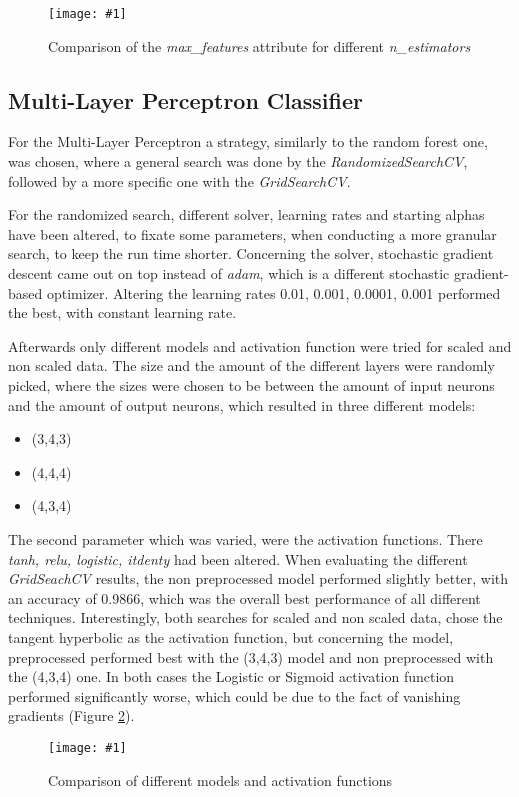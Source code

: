 \documentclass{article}
\newcommand{\size}{0.8\textwidth}
\newcommand{\image}[3]{
\begin{figure}
\begin{center}
\texttt{[image: \#1]}
\caption{#2}
#3
\end{center}
\end{figure}
}
\begin{document}
\image{plots/rf_np_comparision.png}{Comparison of the \textit{max\_features} attribute for different \textit{n\_estimators}}{\label{rf}}

\subsection{Multi-Layer Perceptron Classifier}
For the Multi-Layer Perceptron a strategy, similarly to the random forest one,  was chosen, where a general search was done by the \textit{RandomizedSearchCV}, followed by a more specific one with the \textit{GridSearchCV}.

For the randomized search, different solver, learning rates and starting alphas have been altered, to fixate some parameters, when conducting a more granular search, to keep the run time shorter. Concerning the solver, stochastic gradient descent came out on top instead of \textit{adam}, which is a different stochastic gradient-based optimizer. Altering the learning rates 0.01, 0.001, 0.0001, 0.001 performed the best, with constant learning rate.

Afterwards only different models and activation function were tried for scaled and non scaled data. The size and the amount of the different layers were randomly picked, where the sizes were chosen to be between the amount of input neurons and the amount of output neurons, which resulted in three different models:

\begin{itemize}
\item (3,4,3)
\item (4,4,4)
\item (4,3,4)
\end{itemize}

The second parameter which was varied, were the activation functions. There \textit{tanh, relu, logistic, itdenty} had been altered. When evaluating the different \textit{GridSeachCV} results, the non preprocessed model performed slightly better, with an accuracy of 0.9866, which was the overall best performance of all different techniques. Interestingly, both searches for scaled and non scaled data, chose the tangent hyperbolic as the activation function, but concerning the model, preprocessed performed best with the (3,4,3) model and non preprocessed with the (4,3,4) one. In both cases the Logistic or Sigmoid activation function performed significantly worse, which could be due to the fact of vanishing gradients (Figure \ref{mlp}).

\image{plots/mlp_np_comparision.png}{Comparison of different models and activation functions}{\label{mlp}}
\end{document}
